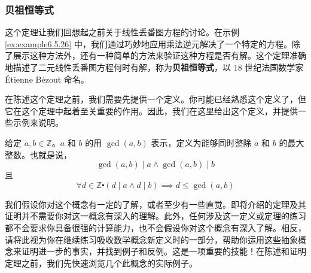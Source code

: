 \subsubsection*{贝祖恒等式}

这个定理让我们回想起之前关于线性丢番图方程的讨论。在示例 \ref{ex:example6.5.26} 中，我们通过巧妙地应用乘法逆元解决了一个特定的方程。除了展示这种方法外，还有一种简单的方法来验证这种方程是否有解。这个定理准确地描述了二元线性丢番图方程何时有解，称为\textbf{贝祖恒等式}，以 $18$ 世纪法国数学家 Étienne Bézout 命名。

在陈述这个定理之前，我们需要先提供一个定义。你可能已经熟悉这个定义了，但它在这个定理中起着至关重要的作用。因此，我们在这里给出这个定义，并提供一些示例来说明。

\begin{definition}[最大公约数]\label{def:definition6.5.29}
    给定 $a,b \in \mathbb{Z}$。$a$ 和 $b$ 的用 $\gcd(a, b)$ 表示，定义为能够同时整除 $a$ 和 $b$ 的最大整数。也就是说，
    \[\gcd(a, b) \mid a \land \gcd(a, b) \mid b\]
    且
    \[\forall d \in \mathbb{Z} \centerdot (d \mid a \land d \mid b) \implies d \le \gcd(a, b)\]
\end{definition}

我们假设你对这个概念有一定的了解，或者至少有一些直觉。即将介绍的定理及其证明并不需要你对这一概念有深入的理解。此外，任何涉及这一定义或定理的练习都不会要求你具备很强的计算能力，也不会假设你对这个概念有深入了解。相反，请将此视为你在继续练习吸收数学概念新定义时的一部分，帮助你运用这些抽象概念来证明进一步的事实，并找到例子和反例。这是一项重要的技能！在陈述和证明定理之前，我们先快速浏览几个此概念的实际例子。\\

